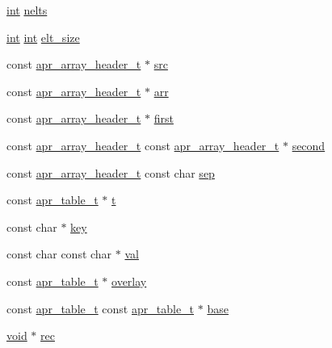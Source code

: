 \begin{DoxyCompactItemize}
\item 
\hyperlink{pcre_8txt_a42dfa4ff673c82d8efe7144098fbc198}{int} \hyperlink{group__apr__tables_ga3f892b271cc0564b2d8e9536a96abd7c}{nelts}
\item 
\hyperlink{pcre_8txt_a42dfa4ff673c82d8efe7144098fbc198}{int} \hyperlink{pcre_8txt_a42dfa4ff673c82d8efe7144098fbc198}{int} \hyperlink{group__apr__tables_ga922b4b4bccf7114fd241df5bd432ad58}{elt\+\_\+size}
\item 
const \hyperlink{structapr__array__header__t}{apr\+\_\+array\+\_\+header\+\_\+t} $\ast$ \hyperlink{group__apr__tables_gab6e7405500bdd51690dc9ef83744684f}{src}
\item 
const \hyperlink{structapr__array__header__t}{apr\+\_\+array\+\_\+header\+\_\+t} $\ast$ \hyperlink{group__apr__tables_ga1e3f66bfb173c9a913ef3bb37842e273}{arr}
\item 
const \hyperlink{structapr__array__header__t}{apr\+\_\+array\+\_\+header\+\_\+t} $\ast$ \hyperlink{group__apr__tables_ga950d7fed8d587d0a9318ffd24f95096f}{first}
\item 
const \hyperlink{structapr__array__header__t}{apr\+\_\+array\+\_\+header\+\_\+t} const \hyperlink{structapr__array__header__t}{apr\+\_\+array\+\_\+header\+\_\+t} $\ast$ \hyperlink{group__apr__tables_gade8df35e4d83c24788cf409262f7fc51}{second}
\item 
const \hyperlink{structapr__array__header__t}{apr\+\_\+array\+\_\+header\+\_\+t} const char \hyperlink{group__apr__tables_ga37d96adf842aef6b03690e17874c9ed8}{sep}
\item 
const \hyperlink{structapr__table__t}{apr\+\_\+table\+\_\+t} $\ast$ \hyperlink{group__apr__tables_gad0d127e044cb4fd448cde5c19d10179e}{t}
\item 
const char $\ast$ \hyperlink{group__apr__tables_gacd3d88da3c0e0313c3645ff34f62f542}{key}
\item 
const char const char $\ast$ \hyperlink{group__apr__tables_ga4d708cd93abeca73400ed82977502830}{val}
\item 
const \hyperlink{structapr__table__t}{apr\+\_\+table\+\_\+t} $\ast$ \hyperlink{group__apr__tables_ga13c7c35ef67602a57343d21ee1d62e61}{overlay}
\item 
const \hyperlink{structapr__table__t}{apr\+\_\+table\+\_\+t} const \hyperlink{structapr__table__t}{apr\+\_\+table\+\_\+t} $\ast$ \hyperlink{group__apr__tables_ga74964146831939c658b798439fc32f6d}{base}
\item 
\hyperlink{group__MOD__ISAPI_gacd6cdbf73df3d9eed42fa493d9b621a6}{void} $\ast$ \hyperlink{group__apr__tables_gafcb9c0f7671f566c4804fa8bbad43c4b}{rec}

\end{DoxyCompactItemize}
